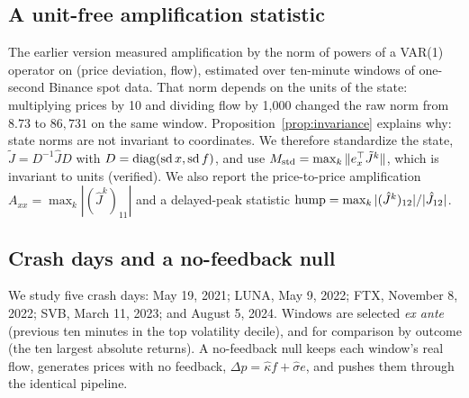 \subsection{A unit-free amplification statistic}
The earlier version measured amplification by the norm of powers of a VAR(1) operator on (price deviation, flow), estimated over ten-minute windows of one-second Binance spot data. That norm depends on the units of the state: multiplying prices by 10 and dividing flow by 1,000 changed the raw norm from $8.73$ to $86{,}731$ on the same window. Proposition~\ref{prop:invariance} explains why: state norms are not invariant to coordinates. We therefore standardize the state, $\tilde J=D^{-1}\hat JD$ with $D={\rm diag}({\rm sd}\,x,{\rm sd}\,f)$, and use $M_{\rm std}=\max_k\|e_x^\top\tilde J^k\|$, which is invariant to units (verified). We also report the price-to-price amplification $A_{xx}=\max_k|(\hat J^k)_{11}|$ and a delayed-peak statistic ${\rm hump}=\max_k|(\hat J^k)_{12}|/|\hat J_{12}|$.

\subsection{Crash days and a no-feedback null}
We study five crash days: May 19, 2021; LUNA, May 9, 2022; FTX, November 8, 2022; SVB, March 11, 2023; and August 5, 2024. Windows are selected \emph{ex ante} (previous ten minutes in the top volatility decile), and for comparison by outcome (the ten largest absolute returns). A no-feedback null keeps each window's real flow, generates prices with no feedback, $\Delta p=\hat\kappa f+\hat\sigma e$, and pushes them through the identical pipeline.


